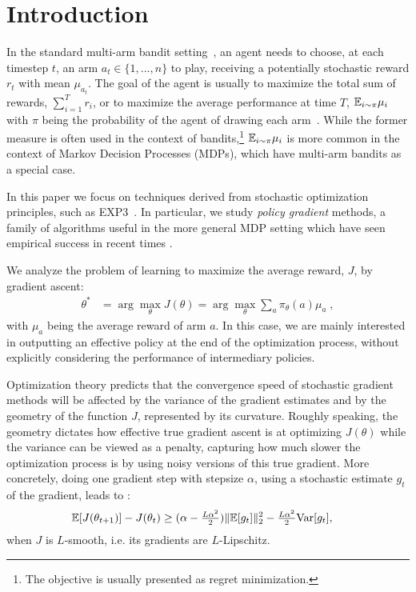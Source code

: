 \section{Introduction}
In the standard multi-arm bandit setting~\cite{robbins1952some}, an agent needs to choose, at each timestep $t$, an arm $a_t \in \{1, ..., n\}$ to play, receiving a potentially stochastic reward $r_t$ with mean $\mu_{a_t}$. The goal of the agent is usually to maximize the total sum of rewards, $\sum_{i=1}^T r_i$, or to maximize the average performance at time $T$, $\mathbb{E}_{i\sim \pi} \mu_i$ with $\pi$ being the probability of the agent of drawing each arm~\citep{bubeck2012regret}. While the former measure is often used in the context of bandits,\footnote{The objective is usually presented as regret minimization.} $\mathbb{E}_{i\sim \pi} \mu_i$ is more common in the context of Markov Decision Processes (MDPs), which have multi-arm bandits as a special case.

In this paper we focus on techniques derived from stochastic optimization principles, such as EXP3~\citep{auer2002nonstochastic, seldin2013evaluation}. %
In particular, we study \textit{policy gradient} methods, a family of algorithms useful in the more general MDP setting which have seen empirical success in recent times \cite{schulman2017proximal}. 


We analyze the problem of learning to maximize the average reward, $J$, by gradient ascent:
\begin{align}
    \theta^\ast &= \arg\max_\theta J(\theta)
    = \arg\max_\theta \sum_{a} \pi_\theta(a) \mu_a \; , \label{eq:bandit_loss} 
\end{align} 
with $\mu_a$ being the average reward of arm $a$.
In this case, we are mainly interested in outputting an effective policy at the end of the optimization process, without explicitly considering the performance of intermediary policies.%


Optimization theory predicts that the convergence speed of stochastic gradient methods will be affected by the variance of the gradient estimates and by the geometry of the function $J$, represented by its curvature. Roughly speaking, the geometry dictates how effective true gradient ascent is at optimizing $J(\theta)$ while the variance can be viewed as a penalty, capturing how much slower the optimization process is by using noisy versions of this true gradient. More concretely, doing one gradient step with stepsize $\alpha$, using a stochastic estimate $g_t$ of the gradient, leads to \citep{bottou2018optimization}:
\begin{align*}\mathbb{E}[J(\theta_{t+1})] - J(\theta_t) &\geq (\alpha - \tfrac{L \alpha^2}{2}) \|\mathbb{E} [g_t] \|^2_2  - \tfrac{ L \alpha^2}{2} \text{Var}[g_t ],\end{align*}
when $J$ is $L$-smooth, i.e. its gradients are $L$-Lipschitz. 

